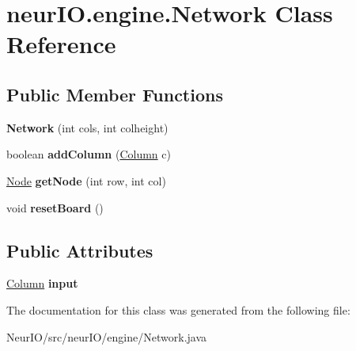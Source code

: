 \hypertarget{classneur_i_o_1_1engine_1_1_network}{}\section{neur\+I\+O.\+engine.\+Network Class Reference}
\label{classneur_i_o_1_1engine_1_1_network}
\subsection*{Public Member Functions}
\begin{DoxyCompactItemize}
\item 
\mbox{\label{classneur_i_o_1_1engine_1_1_network_a33df63f4e69799f58a0c36e953c92ab0}} 
{\bfseries Network} (int cols, int colheight)
\item 
\mbox{\label{classneur_i_o_1_1engine_1_1_network_ad46d0fee3e111e29a03431f5591eaf79}} 
boolean {\bfseries add\+Column} (\hyperlink{classneur_i_o_1_1engine_1_1_column}{Column} c)
\item 
\mbox{\label{classneur_i_o_1_1engine_1_1_network_a1b0ab79360a41695de4b06df2c7974e0}} 
\hyperlink{classneur_i_o_1_1system_1_1_node}{Node} {\bfseries get\+Node} (int row, int col)
\item 
\mbox{\label{classneur_i_o_1_1engine_1_1_network_a1d96332ab8340f429e6aedbd5180fc35}} 
void {\bfseries reset\+Board} ()
\end{DoxyCompactItemize}
\subsection*{Public Attributes}
\begin{DoxyCompactItemize}
\item 
\mbox{\label{classneur_i_o_1_1engine_1_1_network_a385e3964dd1f88834f266e4b3cc40e1c}} 
\hyperlink{classneur_i_o_1_1engine_1_1_column}{Column} {\bfseries input}
\end{DoxyCompactItemize}


The documentation for this class was generated from the following file\+:\begin{DoxyCompactItemize}
\item 
Neur\+I\+O/src/neur\+I\+O/engine/Network.\+java\end{DoxyCompactItemize}
